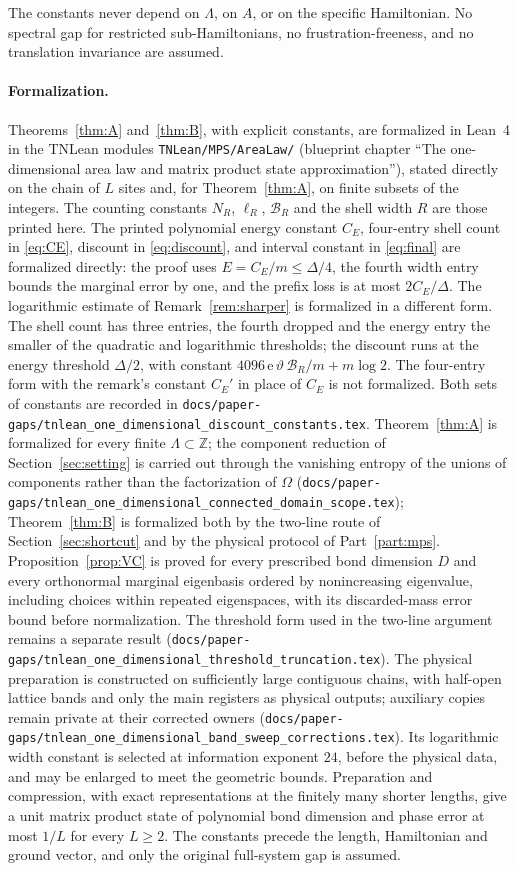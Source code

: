 \documentclass[aps,prx,reprint,superscriptaddress,floatfix,nofootinbib,longbibliography,amsmath,amssymb]{revtex4-2}
\newcommand{\Z}{\mathbb Z}
\newcommand{\cB}{\mathcal B}
\newcommand{\Om}{\Omega}
\newcommand{\Lam}{\Lambda}
\newcommand{\e}{\mathrm e}
\theoremstyle{plain}
\theoremstyle{definition}
\begin{document}
The constants never depend on $\Lam$, on $A$, or on the specific
Hamiltonian. No spectral gap for restricted sub-Hamiltonians, no
frustration-freeness, and no translation invariance are assumed.

\paragraph{Formalization.}
Theorems~\ref{thm:A} and~\ref{thm:B}, with explicit constants, are
formalized in Lean~4 in the TNLean modules \texttt{TNLean/MPS/AreaLaw/}
(blueprint chapter ``The one-dimensional area law and matrix product state
approximation''), stated directly on the chain of $L$ sites and, for
Theorem~\ref{thm:A}, on finite subsets of the integers. The counting
constants $N_R$, $\ell_R$, $\cB_R$ and the shell width $R$ are those printed
here. The printed polynomial energy constant $C_E$, four-entry shell count
in \eqref{eq:CE}, discount in \eqref{eq:discount}, and interval constant
in \eqref{eq:final} are formalized directly: the proof uses
$E=C_E/m\le\Delta/4$, the fourth width entry bounds the marginal error
by one, and the prefix loss is at most $2C_E/\Delta$.
The logarithmic estimate of Remark~\ref{rem:sharper} is formalized in a
different form. The shell count has three entries, the fourth dropped and
the energy entry the smaller of the quadratic and logarithmic thresholds;
the discount runs at the energy threshold $\Delta/2$, with constant
$4096\,\e\,\vartheta\,\cB_R/m+m\log2$. The four-entry form with the remark's
constant $C_E'$ in place of $C_E$ is not formalized.
Both sets of constants are recorded in
\nolinkurl{docs/paper-gaps/tnlean_one_dimensional_discount_constants.tex}.
Theorem~\ref{thm:A} is formalized for every finite $\Lam\subset\Z$; the
component reduction of Section~\ref{sec:setting} is carried out through the
vanishing entropy of the unions of components rather than the factorization
of $\Om$
(\nolinkurl{docs/paper-gaps/tnlean_one_dimensional_connected_domain_scope.tex});
Theorem~\ref{thm:B} is formalized both by the two-line route of
Section~\ref{sec:shortcut} and by the physical protocol of Part~\ref{part:mps}.
Proposition~\ref{prop:VC} is proved for every prescribed bond dimension $D$
and every orthonormal marginal eigenbasis ordered by nonincreasing
eigenvalue, including choices within repeated eigenspaces, with its
discarded-mass error bound before normalization. The threshold form used in
the two-line argument remains a separate result
(\nolinkurl{docs/paper-gaps/tnlean_one_dimensional_threshold_truncation.tex}).
The physical preparation is constructed on sufficiently large contiguous
chains, with half-open lattice bands and only the main registers as physical
outputs; auxiliary copies remain private at their corrected owners
(\nolinkurl{docs/paper-gaps/tnlean_one_dimensional_band_sweep_corrections.tex}).
Its logarithmic width constant is selected at information exponent $24$,
before the physical data, and may be enlarged to meet the geometric bounds.
Preparation and compression, with exact representations
at the finitely many shorter lengths, give a unit matrix product state of
polynomial bond dimension and phase error at most $1/L$ for every $L\ge2$.
The constants precede the length, Hamiltonian and ground vector, and only
the original full-system gap is assumed.
\end{document}
